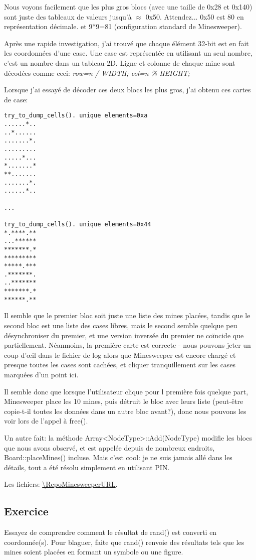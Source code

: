 Nous voyons facilement que les plus gros blocs (avec une taille de 0x28 et 0x140) sont
juste des tableaux de valeurs jusqu'à $\approx$ 0x50.
Attendez... 0x50 est 80 en représentation décimale. et 9*9=81 (configuration standard
de Minesweeper).

Après une rapide investigation, j'ai trouvé que chaque élément 32-bit est en fait
les coordonnées d'une case.
Une case est représentée en utilisant un seul nombre, c'est un nombre dans un tableau-2D.
Ligne et colonne de chaque mine sont décodées comme ceci: \emph{row=n / WIDTH; col=n \% HEIGHT;}

Lorsque j'ai essayé de décoder ces deux blocs les plus gros, j'ai obtenu ces
cartes de case:

\begin{lstlisting}
try_to_dump_cells(). unique elements=0xa
......*..
..*......
.......*.
.........
.....*...
*.......*
**.......
.......*.
......*..

...

try_to_dump_cells(). unique elements=0x44
*.****.**
...******
*******.*
*********
*****.***
.*******.
..*******
*******.*
******.**
\end{lstlisting}

Il semble que le premier bloc soit juste une liste des mines placées, tandis que le
second bloc est une liste des cases libres, mais le second semble quelque peu désynchroniser
du premier, et une version inversée du premier ne coïncide que partiellement.
Néanmoins, la première carte est correcte - nous pouvons jeter un coup d'\oe{}il
dans le fichier de log alors que Minesweeper est encore chargé et presque toutes
les cases sont cachées, et cliquer tranquillement sur les cases marquées d'un point
ici.

Il semble donc que lorsque l'utilisateur clique pour l première fois quelque part,
Minesweeper place les 10 mines, puis détruit le bloc avec leurs liste (peut-être
copie-t-il toutes les données dans un autre bloc avant?), donc nous pouvons les voir
lors de l'appel à free().

Un autre fait: la méthode Array<NodeType>::Add(NodeType) modifie les blocs que nous
avons observé, et est appelée depuis de nombreux endroits, Board::placeMines() incluse.
Mais c'est cool: je ne suis jamais allé dans les détails, tout a été résolu simplement
en utilisant PIN.

Les fichiers: \url{\RepoMinesweeperURL}.

\subsection{Exercice}

Essayez de comprendre comment le résultat de rand() est converti en coordonnée(s).
Pour blaguer, faite que rand() renvoie des résultats tels que les mines
soient placées en formant un symbole ou une figure.
